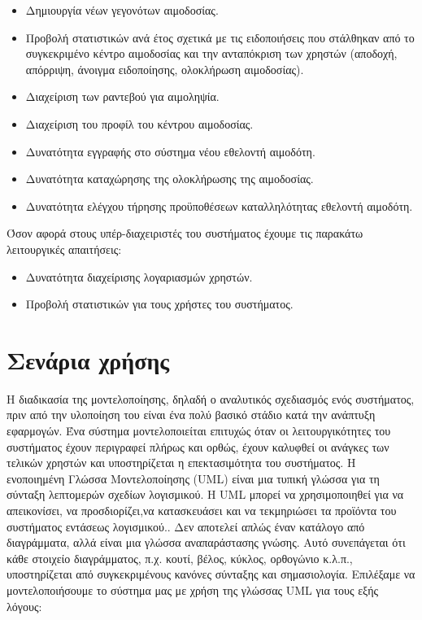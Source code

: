 				\begin{itemize}
					\item Δημιουργία νέων γεγονότων αιμοδοσίας.
					\item Προβολή στατιστικών ανά έτος σχετικά με τις ειδοποιήσεις που στάλθηκαν από το συγκεκριμένο κέντρο αιμοδοσίας και την ανταπόκριση των χρηστών (αποδοχή, απόρριψη, άνοιγμα ειδοποίησης, ολοκλήρωση αιμοδοσίας).
					\item Διαχείριση των ραντεβού για αιμοληψία.
					\item Διαχείριση του προφίλ του κέντρου αιμοδοσίας.
					\item Δυνατότητα εγγραφής στο σύστημα νέου εθελοντή αιμοδότη.
					\item Δυνατότητα καταχώρησης της ολοκλήρωσης της αιμοδοσίας.
					\item Δυνατότητα ελέγχου τήρησης προϋποθέσεων καταλληλότητας εθελοντή αιμοδότη.
				\end{itemize}
				Όσον αφορά στους υπέρ-διαχειριστές του συστήματος έχουμε τις παρακάτω λειτουργικές απαιτήσεις:
				\begin{itemize}
					\item Δυνατότητα διαχείρισης λογαριασμών χρηστών.
					\item Προβολή στατιστικών για τους χρήστες του συστήματος.
				\end{itemize}

	
\section{Σενάρια χρήσης}

	Η διαδικασία της μοντελοποίησης, δηλαδή ο αναλυτικός σχεδιασμός ενός συστήματος, πριν από την υλοποίηση του είναι ένα πολύ βασικό στάδιο κατά την ανάπτυξη εφαρμογών. Ένα σύστημα μοντελοποιείται επιτυχώς όταν οι λειτουργικότητες του συστήματος έχουν περιγραφεί πλήρως και ορθώς, έχουν καλυφθεί οι ανάγκες των τελικών χρηστών και υποστηρίζεται η επεκτασιμότητα του συστήματος. 
	Η ενοποιημένη Γλώσσα Μοντελοποίησης (UML) είναι μια τυπική γλώσσα για τη σύνταξη λεπτομερών σχεδίων λογισμικού. Η UML μπορεί να χρησιμοποιηθεί για να απεικονίσει, να προσδιορίζει,να κατασκευάσει και να τεκμηριώσει τα προϊόντα του συστήματος εντάσεως λογισμικού.\cite{Booch2005}. Δεν αποτελεί απλώς έναν κατάλογο από διαγράμματα, αλλά είναι μια γλώσσα αναπαράστασης γνώσης. Αυτό συνεπάγεται ότι κάθε στοιχείο διαγράμματος, π.χ. κουτί, βέλος, κύκλος, ορθογώνιο κ.λ.π., υποστηρίζεται από συγκεκριμένους κανόνες σύνταξης και σημασιολογία.
	 Επιλέξαμε να μοντελοποιήσουμε το σύστημα μας με χρήση της γλώσσας UML για τους εξής λόγους:
	 

